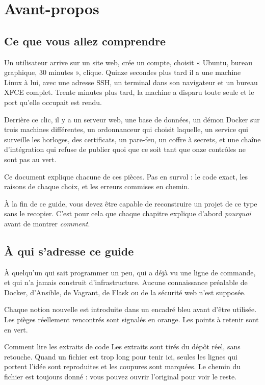 \chapter*{Avant-propos}

\section*{Ce que vous allez comprendre}

Un utilisateur arrive sur un site web, crée un compte, choisit « Ubuntu, bureau
graphique, 30 minutes », clique. Quinze secondes plus tard il a une machine
Linux à lui, avec une adresse SSH, un terminal dans son navigateur et un bureau
XFCE complet. Trente minutes plus tard, la machine a disparu toute seule et le
port qu'elle occupait est rendu.

Derrière ce clic, il y a un serveur web, une base de données, un démon Docker
sur trois machines différentes, un ordonnanceur qui choisit laquelle, un
service qui surveille les horloges, des certificats, un pare-feu, un coffre à
secrets, et une chaîne d'intégration qui refuse de publier quoi que ce soit
tant que onze contrôles ne sont pas au vert.

Ce document explique chacune de ces pièces. Pas en survol : le code exact, les
raisons de chaque choix, et les erreurs commises en chemin.

\begin{retenir}
À la fin de ce guide, vous devez être capable de reconstruire un projet de ce
type sans le recopier. C'est pour cela que chaque chapitre explique d'abord
\emph{pourquoi} avant de montrer \emph{comment}.
\end{retenir}

\section*{À qui s'adresse ce guide}

À quelqu'un qui sait programmer un peu, qui a déjà vu une ligne de commande,
et qui n'a jamais construit d'infrastructure. Aucune connaissance préalable de
Docker, d'Ansible, de Vagrant, de Flask ou de la sécurité web n'est supposée.

Chaque notion nouvelle est introduite dans un encadré bleu avant d'être
utilisée. Les pièges réellement rencontrés sont signalés en orange. Les points
à retenir sont en vert.

\begin{notion}{Comment lire les extraits de code}
Les extraits sont tirés du dépôt réel, sans retouche. Quand un fichier est trop
long pour tenir ici, seules les lignes qui portent l'idée sont reproduites et
les coupures sont marquées. Le chemin du fichier est toujours donné : vous
pouvez ouvrir l'original pour voir le reste.
\end{notion}

